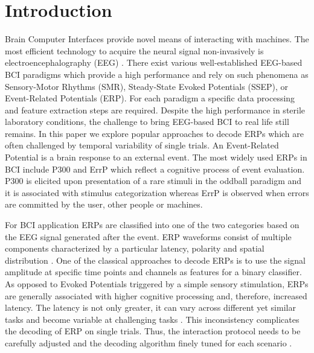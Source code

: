 \documentclass[12pt]{iopart}
\begin{document}
\section{Introduction}
\label{sec:intro}

Brain Computer Interfaces provide novel means of interacting
with machines. The most efficient technology to acquire
the neural signal non-invasively is electroencephalography (EEG) \cite{luck_introduction_2005}.
There exist various well-established EEG-based BCI paradigms which
provide a high performance and rely on such phenomena as
Sensory-Motor Rhythms (SMR), Steady-State Evoked Potentials (SSEP),
or Event-Related Potentials (ERP).
For each paradigm a specific data processing and feature
extraction steps are required.
Despite the high performance in sterile laboratory
conditions, the challenge to bring EEG-based BCI to real life
still remains. In this paper we explore popular approaches to decode ERPs
which are often challenged by temporal variability of single trials.
An Event-Related Potential is a brain response to an external event.
The most widely used ERPs in BCI include P300 and ErrP which
reflect a cognitive process of event evaluation.
P300 is elicited upon presentation of a rare stimuli in the oddball paradigm
and it is associated with stimulus categorization whereas
ErrP is observed when errors are committed by the user, other people or machines.

For BCI application ERPs are classified into one of the two categories 
based on the EEG signal generated after the event.
ERP waveforms consist of multiple components characterized
by a particular latency, polarity and spatial distribution \cite{duncan_event-related_2009}.
One of the classical approaches to decode ERPs is to 
use the signal amplitude at specific time points and channels as features
for a binary classifier.
As opposed to Evoked Potentials triggered by a simple sensory stimulation,
ERPs are generally associated with higher cognitive processing
and, therefore, increased latency. The latency is not only greater, it can
vary across different yet similar tasks and become variable
at challenging tasks \cite{arico_evaluation_2013}. 
This inconsistency complicates the decoding of ERP on single trials.
Thus, the interaction
protocol needs to be carefully adjusted and the decoding
algorithm finely tuned for each scenario \cite{iturrate_task-dependent_2013}.
\end{document}
